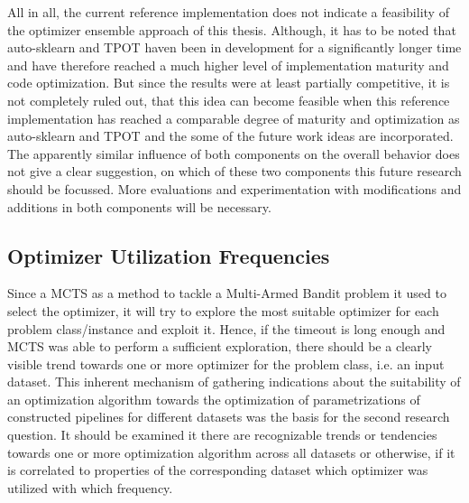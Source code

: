 All in all, the current reference implementation does not indicate a feasibility of the optimizer ensemble approach of this thesis.
Although, it has to be noted that auto-sklearn and TPOT haven been in development for a significantly longer time and have therefore reached a much higher level of implementation maturity and code optimization.\newline
But since the results were at least partially competitive, it is not completely ruled out, that this idea can become feasible when this reference implementation has reached a comparable degree of maturity and optimization as auto-sklearn and TPOT and the some of the future work ideas are incorporated.\newline
The apparently similar influence of both components on the overall behavior does not give a clear suggestion, on which of these two components this future research should be focussed.
More evaluations and experimentation with modifications and additions in both components will be necessary.

\subsection{Optimizer Utilization Frequencies}
\label{sec:evaluation:analysis:optimizer}
Since a MCTS as a method to tackle a Multi-Armed Bandit problem it used to select the optimizer, it will try to explore the most suitable optimizer for each problem class/instance and exploit it.
Hence, if the timeout is long enough and MCTS was able to perform a sufficient exploration, there should be a clearly visible trend towards one or more optimizer for the problem class, i.e. an input dataset.\newline
This inherent mechanism of gathering indications about the suitability of an optimization algorithm towards the optimization of parametrizations of constructed pipelines for different datasets was the basis for the second research question.\newline
It should be examined it there are recognizable trends or tendencies towards one or more optimization algorithm across all datasets or otherwise, if it is correlated to properties of the corresponding dataset which optimizer was utilized with which frequency.

